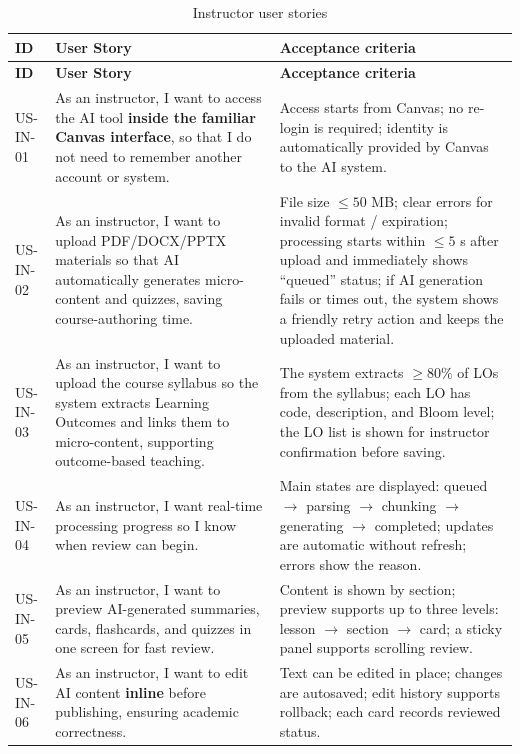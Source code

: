\begin{longtable}{|p{1.6cm}|p{5.6cm}|p{7cm}|}
\caption{Instructor user stories}
\label{tab:user-stories-giang-vien}\\
\hline
\textbf{ID} & \textbf{User Story} & \textbf{Acceptance criteria} \\
\hline
\endfirsthead
\hline
\textbf{ID} & \textbf{User Story} & \textbf{Acceptance criteria} \\
\hline
\endhead
US-IN-01 & As an instructor, I want to access the AI tool \textbf{inside the familiar Canvas interface}, so that I do not need to remember another account or system. & Access starts from Canvas; no re-login is required; identity is automatically provided by Canvas to the AI system. \\
\hline
US-IN-02 & As an instructor, I want to upload PDF/DOCX/PPTX materials so that AI automatically generates micro-content and quizzes, saving course-authoring time. & File size \(\leq 50\) MB; clear errors for invalid format / expiration; processing starts within \(\leq 5\) s after upload and immediately shows ``queued'' status; if AI generation fails or times out, the system shows a friendly retry action and keeps the uploaded material. \\
\hline
US-IN-03 & As an instructor, I want to upload the course syllabus so the system extracts Learning Outcomes and links them to micro-content, supporting outcome-based teaching. & The system extracts \(\geq 80\%\) of LOs from the syllabus; each LO has code, description, and Bloom level; the LO list is shown for instructor confirmation before saving. \\
\hline
US-IN-04 & As an instructor, I want real-time processing progress so I know when review can begin. & Main states are displayed: queued \(\rightarrow\) parsing \(\rightarrow\) chunking \(\rightarrow\) generating \(\rightarrow\) completed; updates are automatic without refresh; errors show the reason. \\
\hline
US-IN-05 & As an instructor, I want to preview AI-generated summaries, cards, flashcards, and quizzes in one screen for fast review. & Content is shown by section; preview supports up to three levels: lesson \(\rightarrow\) section \(\rightarrow\) card; a sticky panel supports scrolling review. \\
\hline
US-IN-06 & As an instructor, I want to edit AI content \textbf{inline} before publishing, ensuring academic correctness. & Text can be edited in place; changes are autosaved; edit history supports rollback; each card records reviewed status. \\

\end{longtable}
